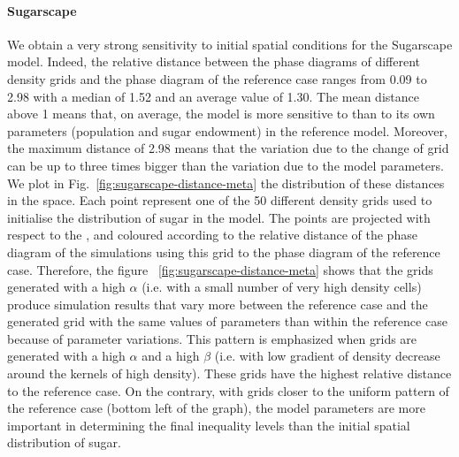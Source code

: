 \documentclass[preprint,5p,times,twocolumn,authoryear]{elsarticle}
\begin{document}
\paragraph{Sugarscape} 



We obtain a very strong sensitivity to initial spatial conditions for the Sugarscape model. Indeed, the relative distance between the phase diagrams of different density grids and the phase diagram of the reference case ranges from 0.09 to 2.98 with a median of 1.52 and an average value of 1.30. The mean distance above 1 means that, on average, the model is more sensitive to  than to its own parameters (population and sugar endowment) in the reference model. Moreover, the maximum distance of 2.98 means that the variation due to the change of grid can be up to three times bigger than the variation due to the model parameters. We plot in Fig.~\ref{fig:sugarscape-distance-meta} the distribution of these distances in the  space. Each point represent one of the 50 different density grids used to initialise the distribution of sugar in the model. The points are projected with respect to the , and coloured according to the relative distance of the phase diagram of the simulations using this grid to the phase diagram of the reference case. Therefore, the figure ~\ref{fig:sugarscape-distance-meta} shows that the grids generated with a high $\alpha$ (i.e. with a small number of very high density cells) produce simulation results that vary more between the reference case and the generated grid with the same values of parameters than within the reference case because of parameter variations. This pattern is emphasized when grids are generated with a high $\alpha$ and a high $\beta$ (i.e. with low gradient of density decrease around the kernels of high density). These grids have the highest relative distance to the reference case. On the contrary, with grids closer to the uniform pattern of the reference case (bottom left of the graph), the model parameters are more important in determining the final inequality levels than the initial spatial distribution of sugar. 
\end{document}
